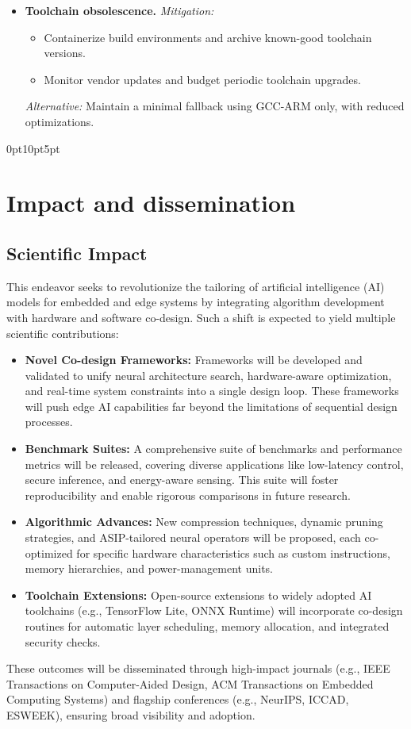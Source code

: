 \begin{itemize}
  \item \textbf{Toolchain obsolescence.} 
    \emph{Mitigation:}  
    \begin{itemize}
      \item Containerize build environments and archive known-good toolchain versions.
      \item Monitor vendor updates and budget periodic toolchain upgrades.
    \end{itemize}
    \emph{Alternative:} Maintain a minimal fallback using GCC-ARM only, with reduced optimizations.
\end{itemize}

\titlespacing*{\section}
  {0pt}{10pt}{5pt}



  
\section{Impact and dissemination}

\subsection{Scientific Impact}
This endeavor seeks to revolutionize the tailoring of artificial intelligence (AI) models for embedded and edge systems by integrating algorithm development with hardware and software co-design. Such a shift is expected to yield multiple scientific contributions:
\begin{itemize}
  \item \textbf{Novel Co-design Frameworks:} Frameworks will be developed and validated to unify neural architecture search, hardware-aware optimization, and real-time system constraints into a single design loop. These frameworks will push edge AI capabilities far beyond the limitations of sequential design processes.
  \item \textbf{Benchmark Suites:} A comprehensive suite of benchmarks and performance metrics will be released, covering diverse applications like low-latency control, secure inference, and energy-aware sensing. This suite will foster reproducibility and enable rigorous comparisons in future research.
  \item \textbf{Algorithmic Advances:} New compression techniques, dynamic pruning strategies, and ASIP-tailored neural operators will be proposed, each co-optimized for specific hardware characteristics such as custom instructions, memory hierarchies, and power-management units.
  \item \textbf{Toolchain Extensions:} Open-source extensions to widely adopted AI toolchains (e.g., TensorFlow Lite, ONNX Runtime) will incorporate co-design routines for automatic layer scheduling, memory allocation, and integrated security checks.
\end{itemize}
These outcomes will be disseminated through high-impact journals (e.g., IEEE Transactions on Computer-Aided Design, ACM Transactions on Embedded Computing Systems) and flagship conferences (e.g., NeurIPS, ICCAD, ESWEEK), ensuring broad visibility and adoption.

